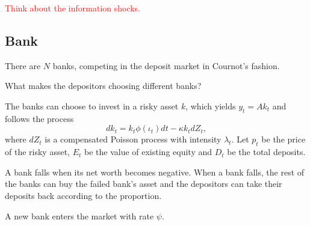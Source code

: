 \documentclass[a4paper, 12pt]{article}
\begin{document}
\textcolor{red}{Think about the information shocks.}

\subsection{Bank}
There are $N$ banks, competing in the deposit market in Cournot's fashion. 

What makes the depositors choosing different banks?

The banks can choose to invest in a risky asset 
$k$, which yields $y_t = Ak_t$ and follows the process 
\begin{equation*}
    dk_t = k_t\phi(\iota_t)dt - \kappa k_tdZ_t, 
\end{equation*} 
where $dZ_t$ is a compensated Poisson process with intensity $\lambda_t$.
Let $p_t$ be the price of the risky asset, $E_t$ be the value of existing 
equity and $D_t$ be the total deposits. 


A bank falls when its net worth becomes negative. When a bank falls, the rest 
of the banks can buy the failed bank's asset and the depositors can take their 
deposits back according to the proportion. 

A new bank enters the market with rate $\psi$. 





\end{document}
